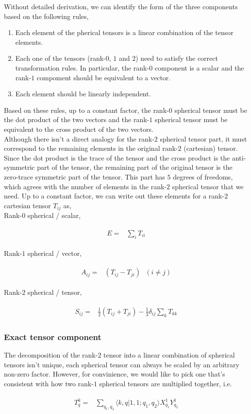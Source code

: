 \documentclass[10pt,fleqn]{article}
\newcommand{\eqar}[1]
{
  \begin{align}
    #1
  \end{align}
}
\newcommand{\paren}[1]{{\left({#1}\right)}}
\begin{document}
Without detailed derivation, we can identify the form of the three components based on
the following rules,
\begin{enumerate}
\item Each element of the pherical tensors is a linear combination
  of the tensor elements.
\item Each one of the tensors (rank-$0$, $1$ and $2$) need to satisfy
  the correct transformation rules.
  In particular, the rank-$0$ component is a scalar
  and the rank-$1$ compoment should be equivalent to a vector.
\item Each element should be linearly independent.
\end{enumerate}
Based on these rules, up to a constant factor,
the rank-$0$ spherical tensor must be the dot product of the two vectors
and the rank-$1$ spherical tensor must be equivalent to the cross product
of the two vectors.\\

Although there isn't a direct analogy for the rank-$2$ spherical tensor part,
it must correspond to the remaining elements in the original
rank-$2$ (cartesian) tensor.
Since the dot product is the trace of the tensor and the cross product
is the anti-symmetric part of the tensor, the remaining part of the original tensor
is the zero-trace symmetric part of the tensor. This part has $5$ degrees of freedoms,
which agrees with the number of elements
in the rank-$2$ spherical tensor that we need.
Up to a constant factor, we can write out these elements for
a rank-$2$ cartesian tensor $T_{ij}$ as,\\

Rank-$0$ spherical / scalar,
\eqar{
  \begin{split}
    E=&\sum_{i}T_{ii}
  \end{split}
}
Rank-$1$ spherical / vector,
\eqar{
  \begin{split}
    A_{ij}=&\paren{T_{ij}-T_{ji}}\ \ \ (i\neq j)
  \end{split}
}
Rank-$2$ spherical / tensor,
\eqar{
  \begin{split}
    S_{ij}=&\frac12\paren{T_{ij}+T_{ji}}-\frac13\delta_{ij}\sum_{k}T_{kk}
  \end{split}\label{eq:symm-tensor-compoments}
}

\subsubsection{Exact tensor component}
The decomposition of the rank-$2$ tensor into a linear combination of spherical tensors
isn't unique, each spherical tensor can always be scaled by
an arbitrary non-zero factor. However, for convinience, we would like to pick one
that's consistent with how two rank-$1$ spherical tensors are multiplied together,
i.e.
\eqar{
  \begin{split}
    T^k_q=&\sum_{q_1,q_2}\langle k,q|1,1;q_1,q_2\rangle X^1_{q_1}Y^1_{q_2}
  \end{split}
}
\end{document}
